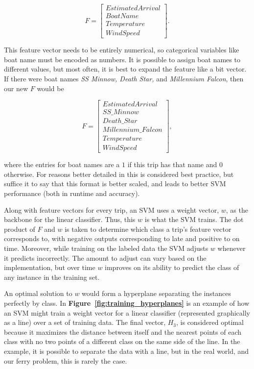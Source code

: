 \documentclass[11pt]{article} %
\begin{document}
\[F=\begin{bmatrix}
        EstimatedArrival \\
        BoatName\\
        Temperature\\
        WindSpeed
\end{bmatrix}.\]

This feature vector needs to be entirely numerical, so categorical variables like
boat name must be encoded as numbers.  It is possible to assign boat names to
different values, but most often, it is best to expand the feature like a bit
vector.  If there were boat names \textit{SS Minnow, Death Star,} and 
\textit{Millennium Falcon}, then our new $F$ would be

\[F=\begin{bmatrix}
        EstimatedArrival \\
        SS\_Minnow\\
        Death\_Star\\
        Millennium\_Falcon\\
        Temperature\\
        WindSpeed
\end{bmatrix},\]

where the entries for boat names are a $1$ if this trip has that name and $0$
otherwise. For reasons better detailed in \cite{chang2011libsvm} this is considered 
best practice, but suffice it to say that this format is better scaled, and 
leads to better SVM performance (both in runtime and accuracy).

Along with feature vectors for every trip, an SVM uses a weight vector, $w$,
as the backbone for the linear classifier. Thus, this $w$ is what the
SVM trains. The dot product of $F$ and $w$ is taken to determine which class a 
trip's feature vector corresponds to, with negative outputs corresponding to 
late and positive to on time. Moreover, while training on the labeled data
the SVM adjusts $w$ whenever it predicts incorrectly.  The amount to adjust
can vary based on the implementation, but over time $w$ improves on its ability
to predict the class of any instance in the training set.

An optimal solution to $w$ would form a hyperplane separating the instances
perfectly by class. In \textbf{Figure~\ref{fig:training_hyperplanes}} is an 
example of how an SVM might train a weight vector for a linear classifier 
(represented graphically as
a line) over a set of training data. The final vector, $H_3$, is considered 
optimal because it maximizes the distance between itself and the nearest points
of each class with no two points of a different class on the same side of the 
line. In the example, it is possible to separate the data with a 
line, but in the real world, and our ferry problem, this is rarely the case.
\end{document}
